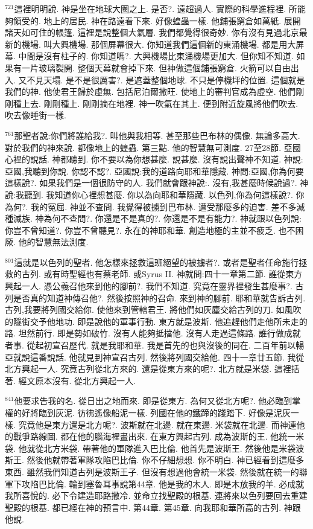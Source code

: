 \documentclass{book}
\begin{document}
$^{721}$這裡明明說.
神是坐在地球大圈之上.
是否?.
遠超過人.
實際的科學進程裡.
所能夠領受的.
地上的居民.
神在路遠看下來.
好像蝗蟲一樣.
他鋪張窮倉如萬紙.
展開諸天如可住的帳篷.
這裡是說整個大氣層.
我們都覺得很奇妙.
你有沒有見過北京最新的機場.
叫大興機場.
那個屏幕很大.
你知道我們這個新的東涌機場.
都是用大屏幕.
中間是沒有柱子的.
你知道嗎?.
大興機場比東涌機場更加大.
但你知不知道.
如果有一片玻璃裂開.
整個天幕就會掉下來.
但神做這個鋪張窮倉.
火箭可以自由出入.
又不見天塌.
是不是很厲害?.
是遮蓋整個地球.
不只是停機坪的位置.
這個就是我們的神.
他使君王歸於虛無.
包括尼泊爾撒旺.
使地上的審判官成為虛空.
他們剛剛種上去.
剛剛種上.
剛剛摘在地裡.
神一吹氣在其上.
便到附近旋風將他們吹去.
吹去像睡街一樣.

$^{761}$那聖者說:你們將誰給我?.
叫他與我相等.
甚至那些巴布林的偶像.
無論多高大.
對於我們的神來說.
都像地上的蝗蟲.
第三點.
他的智慧無可測度.
27至28節.
亞國心裡的說話.
神都聽到.
你不要以為你想甚麼.
說甚麼.
沒有說出聲神不知道.
神說:亞國,我聽到你說.
你認不認?.
亞國說:我的道路向耶和華隱藏.
神問:亞國,你為何要這樣說?.
如果我們是一個很防守的人.
我們就會跟神說:.
沒有,我甚麼時候說過?.
神說:我聽到.
我知道你心裡想甚麼.
你以為向耶和華隱藏.
以色列,你為何這樣說?.
你為何?.
我的冤屈.
神並不查問.
我覺得被擄到巴布林.
遭受那麼多的迫害.
差不多滅種滅族.
神為何不查問?.
你還是不是真的?.
你還是不是有能力?.
神就跟以色列說:你豈不曾知道?.
你豈不曾聽見?.
永在的神耶和華.
創造地極的主並不疲乏.
也不困厥.
他的智慧無法測度.

$^{801}$這就是以色列的聖者.
他怎樣來拯救這班絕望的被擄者?.
或者是聖者任命施行拯救的古列.
或有時聖經也有蔡老師.
或Syrus II.
神就問:四十一章第二節.
誰從東方興起一人.
憑公義召他來到他的腳前?.
我們不知道.
究竟在靈界裡發生甚麼事?.
古列是否真的知道神傳召他?.
然後按照神的召命.
來到神的腳前.
耶和華就告訴古列.
古列,我要將列國交給你.
使他來到管轄君王.
將他們如灰塵交給古列的刀.
如風吹的隧街交予他地功.
即是說他的軍事行動.
東方就是波斯.
他追趕他們走他所未走的路.
坦然前行.
即是勢如破竹.
沒有人能夠抵擋他.
沒有人走過這條路.
誰行做成就者事.
從起初宣召歷代.
就是我耶和華.
我是首先的也與沒後的同在.
二百年前以暢亞就說這番說話.
他就見到神宣召古列.
然後將列國交給他.
四十一章廿五節.
我從北方興起一人.
究竟古列從北方來的.
還是從東方來的呢?.
北方就是米袋.
這裡括著.
經文原本沒有.
從北方興起一人.

$^{841}$他要求告我的名.
從日出之地而來.
即是從東方.
為何又從北方呢?.
他必臨到掌權的好將臨到灰泥.
彷彿遙像船泥一樣.
列國在他的鐵蹄的踐踏下.
好像是泥灰一樣.
究竟他是東方還是北方呢?.
波斯就在北邊.
就在東邊.
米袋就在北邊.
而神連他的戰爭路線圖.
都在他的腦海裡畫出來.
在東方興起古列.
成為波斯的王.
他統一米袋.
他就從北方米袋.
帶著他的軍隊進入巴比倫.
他首先是波斯王.
然後他是米袋波斯王.
然後他就帶著軍隊攻陷巴比倫.
你不仔細想想.
你不明白.
神已經看到這麼多東西.
雖然我們知道古列是波斯王子.
但沒有想過他會統一米袋.
然後就在統一的聯軍下攻陷巴比倫.
輪到塞魯耳事說第44章.
他是我的木人.
即是木放我的羊.
必成就我所喜悅的.
必下令建造耶路撒冷.
並命立找聖殿的根基.
連將來以色列要回去重建聖殿的根基.
都已經在神的預言中.
第44章.
第45章.
向我耶和華所高的古列.
神跟他說.
\end{document}
